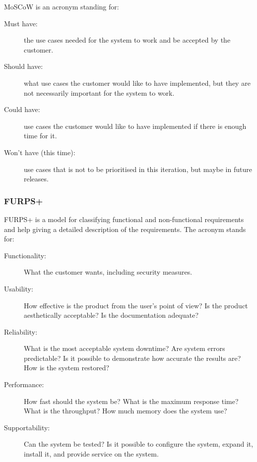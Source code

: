 MoSCoW is an acronym standing for:\\

\begin{description}
    \item [Must have:] the use cases needed for the system to work and be
    accepted by the customer.

    \item [Should have:] what use cases the customer would like to have
    implemented, but they are not necessarily important for the system to work.

    \item [Could have:] use cases the customer would like to have implemented if
    there is enough time for it.

    \item [Won't have (this time):] use cases that is not to be prioritised in
    this iteration, but maybe in future releases.
\end{description}

\subsubsection{FURPS+}
FURPS+ is a model for classifying functional and non-functional requirements and
help giving a detailed description of the requirements. The acronym stands for:

\begin{description}
    \item [Functionality:] What the customer wants, including security measures.

    \item [Usability:] How effective is the product from the user's point of
    view? Is the product aesthetically acceptable? Is the documentation adequate?

    \item [Reliability:] What is the most acceptable system downtime? Are system
    errors predictable? Is it possible to demonstrate how accurate the results
    are? How is the system restored?

    \item [Performance:] How fast should the system be? What is the maximum
    response time? What is the throughput? How much memory does the system use?

    \item [Supportability:] Can the system be tested? Is it possible to
    configure the system, expand it, install it, and provide service on the
    system.
\end{description}

